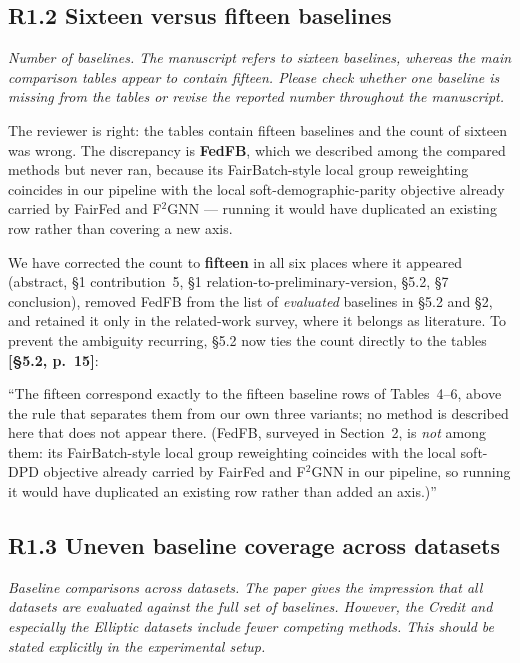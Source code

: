 \documentclass[11pt,a4paper]{article}
\newenvironment{comment}
  {\begin{mdframed}[backgroundcolor=quotegray,linewidth=0pt,skipabove=8pt,
    skipbelow=6pt,innertopmargin=6pt,innerbottommargin=6pt]\itshape}
  {\end{mdframed}}
\newenvironment{newtextbox}
  {\begin{mdframed}[linecolor=newtext!45,linewidth=0.8pt,skipabove=6pt,
    skipbelow=8pt,innertopmargin=6pt,innerbottommargin=6pt]\small}
  {\end{mdframed}}
\newcommand{\where}[1]{\textcolor{revblue}{\textbf{[#1]}}}
\begin{document}
\subsection*{R1.2 Sixteen versus fifteen baselines}

\begin{comment}
Number of baselines. The manuscript refers to sixteen baselines, whereas the
main comparison tables appear to contain fifteen. Please check whether one
baseline is missing from the tables or revise the reported number throughout the
manuscript.
\end{comment}

The reviewer is right: the tables contain fifteen baselines and the count of
sixteen was wrong. The discrepancy is \textbf{FedFB}, which we described among
the compared methods but never ran, because its FairBatch-style local group
reweighting coincides in our pipeline with the local soft-demographic-parity
objective already carried by FairFed and F$^2$GNN --- running it would have
duplicated an existing row rather than covering a new axis.

We have corrected the count to \textbf{fifteen} in all six places where it
appeared (abstract, \S1 contribution~5, \S1 relation-to-preliminary-version,
\S5.2, \S7 conclusion), removed FedFB from the list of \emph{evaluated}
baselines in \S5.2 and \S2, and retained it only in the related-work survey,
where it belongs as literature. To prevent the ambiguity recurring, \S5.2 now
ties the count directly to the tables \where{\S5.2, p.~15}:

\begin{newtextbox}
``The fifteen correspond exactly to the fifteen baseline rows of Tables~4--6,
above the rule that separates them from our own three variants; no method is
described here that does not appear there. (FedFB, surveyed in Section~2, is
\emph{not} among them: its FairBatch-style local group reweighting coincides
with the local soft-DPD objective already carried by FairFed and
F$^2$GNN in our pipeline, so running it would have duplicated an existing row
rather than added an axis.)''
\end{newtextbox}

\subsection*{R1.3 Uneven baseline coverage across datasets}

\begin{comment}
Baseline comparisons across datasets. The paper gives the impression that all
datasets are evaluated against the full set of baselines. However, the Credit
and especially the Elliptic datasets include fewer competing methods. This
should be stated explicitly in the experimental setup.
\end{comment}
\end{document}
